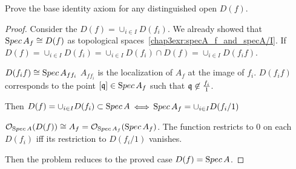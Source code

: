 \documentclass[11pt,fleqn]{book}
\begin{document}
\begin{exr}
Prove the base identity axiom for any distinguished open $D(f)$. 
\end{exr}
\begin{proof}
Consider the $D(f)=\cup_{i\in I}D(f_i)$. We already showed that ${\text Spec\,} A_f\cong D(f)$ as topological spaces~\ref{chap3exr:specA_f_and_specA/I}. If $D(f)=\cup_{i\in I}D(f_i)=\cup_{i\in I}D(f_i)\cap D(f)=\cup_{i\in I}D(f_if)$.

$D(f_i f)\cong{\text Spec\,} A_{ff_i}$ $A_{ff_i}$ is the localization of $A_f$ at the image of $f_i$. $D(f_i f)$ corresponds to the point $[\mathfrak q]\in {\text Spec\,} A_f$ such that $\mathfrak q\not\in \frac{f_i}{1}$.

Then $D(f)=\cup_{i\in I}D(f_i)\subset {\text Spec\,} A$ $\Longleftrightarrow$ ${\text Spec\,} A_f=\cup_{i\in I} D(f_i/1)$

${\cal O}_{{\text Spec\,} A}(D(f))\cong A_f={\cal O}_{{\text Spec\,} A_f}({\text Spec\,} A_f)$. The function restricts to $0$ on each $D(f_i)$ iff its restriction to $D(f_i/1)$ vanishes.

Then the problem reduces to the proved case $D(f)={\text Spec\,} A$.
\end{proof}
\end{document}
